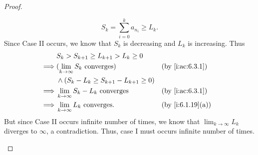 \begin{proof}
\begin{itemize}
\[            S_k = \sum_{i = 0}^k a_{n_i} \geq L_k.
          \]
          Since Case II occurs, we know that \(S_k\) is decreasing and \(L_k\) is increasing.
          Thus
          \begin{align*}
                     & S_k > S_{k + 1} \geq L_{k + 1} > L_k \geq 0                               \\
            \implies & (\lim_{k \to \infty} S_k \text{ converges})         &  & \by{i:ac:6.3.1}  \\
                     & \land (S_k - L_k \geq S_{k + 1} - L_{k + 1} \geq 0)                       \\
            \implies & \lim_{k \to \infty} S_k - L_k \text{ converges}     &  & \by{i:ac:6.3.1}  \\
            \implies & \lim_{k \to \infty} L_k \text{ converges}.          &  & \by{i:6.1.19}[a]
          \end{align*}
          But since Case II occurs infinite number of times, we know that \(\lim_{k \to \infty} L_k\) diverges to \(\infty\), a contradiction.
          Thus, case I must occurs infinite number of times.


\end{itemize}
\end{proof}
